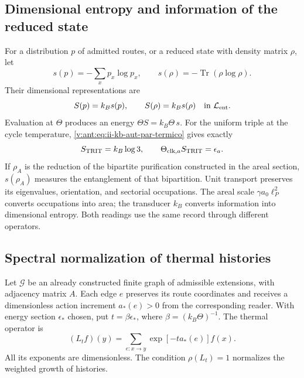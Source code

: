 \subsection{Dimensional entropy and information of the reduced state}

For a distribution \(p\) of admitted routes, or a reduced state
with density matrix \(\rho\), let
\[
 s(p)=-\sum_xp_x\log p_x,\qquad
 s(\rho)=-\operatorname{Tr}(\rho\log\rho).
\]
Their dimensional representations are
\begin{equation}
 S(p)=k_Bs(p),\qquad S(\rho)=k_Bs(\rho)
 \quad\text{in }\mathcal L_{\rm ent}.
 \label{v:ant:eq:ii-kb-aut-entropia}
\end{equation}
Evaluation at \(\Theta\) produces an energy
\(\Theta S=k_B\Theta\,s\). For the uniform triple at the cycle
temperature, \eqref{v:ant:eq:ii-kb-aut-par-termico} gives exactly
\[
 S_{\rm TRIT}=k_B\log3,\qquad
 \Theta_{{\rm clk},a}S_{\rm TRIT}=\epsilon_a.
\]
If \(\rho_A\) is the reduction of the bipartite purification
constructed in the areal section, \(s(\rho_A)\) measures the entanglement
of that bipartition. Unit transport preserves its
eigenvalues, orientation, and sectorial occupations. The areal scale
\(\gamma a_0\ell_P^2\) converts occupations into area; the
transducer \(k_B\) converts information into dimensional entropy.
Both readings use the same record through different operators.

\subsection{Spectral normalization of thermal histories}

Let \(\mathcal G\) be an already constructed finite graph of admissible
extensions, with adjacency matrix \(A\). Each edge \(e\) preserves
its route coordinates and receives a dimensionless action increment
\(a_*(e)>0\) from the corresponding reader. With energy section
\(\epsilon_*\) chosen, put \(t=\beta\epsilon_*\), where
\(\beta=(k_B\Theta)^{-1}\). The thermal operator is
\begin{equation}
 (L_tf)(y)=\sum_{e:x\to y}\exp[-t a_*(e)]f(x).
 \label{v:ant:eq:ii-kb-aut-operador}
\end{equation}
All its exponents are dimensionless. The condition
\(\rho(L_t)=1\) normalizes the weighted growth of histories.

